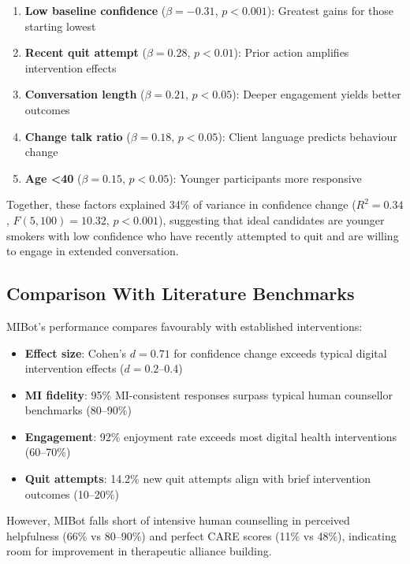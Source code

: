 \begin{enumerate}
\item \textbf{Low baseline confidence} ($\beta=-0.31$, $p<0.001$): Greatest gains for those starting lowest
\item \textbf{Recent quit attempt} ($\beta=0.28$, $p<0.01$): Prior action amplifies intervention effects
\item \textbf{Conversation length} ($\beta=0.21$, $p<0.05$): Deeper engagement yields better outcomes
\item \textbf{Change talk ratio} ($\beta=0.18$, $p<0.05$): Client language predicts behaviour change
\item \textbf{Age <40} ($\beta=0.15$, $p<0.05$): Younger participants more responsive
\end{enumerate}

Together, these factors explained 34\% of variance in confidence change ($R^2=0.34$, $F(5,100)=10.32$, $p<0.001$), suggesting that ideal candidates are younger smokers with low confidence who have recently attempted to quit and are willing to engage in extended conversation.

\subsection{Comparison With Literature Benchmarks}

MIBot's performance compares favourably with established interventions:

\begin{itemize}
\item \textbf{Effect size}: Cohen's $d=0.71$ for confidence change exceeds typical digital intervention effects ($d=0.2$--0.4) \citep{Whittaker2016}
\item \textbf{MI fidelity}: 95\% MI-consistent responses surpass typical human counsellor benchmarks (80--90\%) \citep{Moyers2016}
\item \textbf{Engagement}: 92\% enjoyment rate exceeds most digital health interventions (60--70\%) \citep{Perski2017}
\item \textbf{Quit attempts}: 14.2\% new quit attempts align with brief intervention outcomes (10--20\%) \citep{Stead2013}
\end{itemize}

However, MIBot falls short of intensive human counselling in perceived helpfulness (66\% vs 80--90\%) and perfect CARE scores (11\% vs 48\%), indicating room for improvement in therapeutic alliance building.

